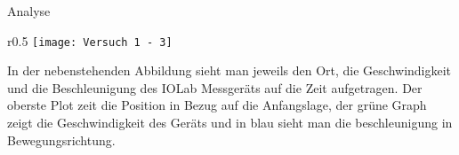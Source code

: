 \documentclass{alex_hü}
\begin{document}
\begin{mybox}{Analyse}
	\begin{wrapfigure}[100]{r}{0.5\textwidth}
		\centering
		\texttt{[image: Versuch 1 - 3]}
	\end{wrapfigure}
	In der nebenstehenden Abbildung sieht man jeweils den Ort, die Geschwindigkeit und die Beschleunigung des IOLab Messgeräts auf die Zeit aufgetragen. Der oberste Plot zeit die Position in Bezug auf die Anfangslage, der grüne Graph zeigt die Geschwindigkeit des Geräts und in blau sieht man die beschleunigung in Bewegungsrichtung.
%
\end{mybox}
\end{document}
